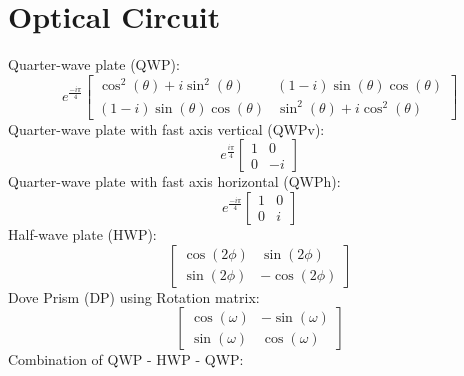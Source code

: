 \documentclass{article}
\begin{document}
\section{Optical Circuit}
	Quarter-wave plate (QWP):
	\begin{equation*}
		e^{\frac{-i \pi}{4}}
			\begin{bmatrix}
				\cos^2 (\theta) + i \sin^2 (\theta) & (1-i) \sin(\theta)\cos(\theta) \\
				(1-i) \sin(\theta)\cos(\theta) & \sin^2 (\theta) + i \cos^2(\theta)
			\end{bmatrix}
	\end{equation*}
	Quarter-wave plate with fast axis vertical (QWPv):
	\begin{equation*}
		e^{\frac{i \pi}{4}}
		\begin{bmatrix}
			1 & 0 \\
			0 & -i
		\end{bmatrix}
	\end{equation*}
	Quarter-wave plate with fast axis horizontal (QWPh):
	\begin{equation*}
		e^{\frac{-i \pi}{4}}
		\begin{bmatrix}
			1 & 0 \\
			0 & i
		\end{bmatrix}
	\end{equation*}
	Half-wave plate (HWP):
	\begin{equation*}
		\begin{bmatrix}
			\cos(2\phi) & \sin(2\phi) \\
			\sin(2\phi) & -\cos(2\phi)
		\end{bmatrix}
	\end{equation*}
	Dove Prism (DP) using Rotation matrix:
	\begin{equation*}
		\begin{bmatrix}
			\cos(\omega) & -\sin(\omega) \\
			\sin(\omega) & \cos(\omega)
		\end{bmatrix}
	\end{equation*}
	Combination of QWP - HWP - QWP:
\end{document}
